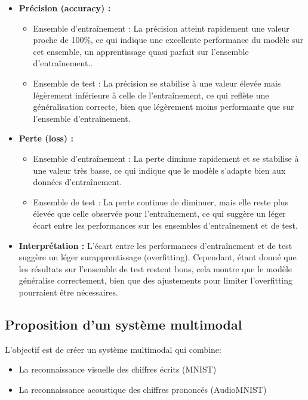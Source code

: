 \begin{itemize}
    \item \textbf{Précision (accuracy) :}
    \begin{itemize}
        \item Ensemble d'entraînement : La précision atteint rapidement une valeur proche de 100\%, ce qui indique une excellente performance du modèle sur cet ensemble, un apprentissage quasi parfait sur l'ensemble d'entraînement..
        \item Ensemble de test : La précision se stabilise à une valeur élevée mais légèrement inférieure à celle de l'entraînement, ce qui reflète une généralisation correcte, bien que légèrement moins performante que sur l'ensemble d'entraînement.
    \end{itemize}
    
    \item \textbf{Perte (loss) :}
    \begin{itemize}
        \item Ensemble d'entraînement : La perte diminue rapidement et se stabilise à une valeur très basse, ce qui indique que le modèle s'adapte bien aux données d'entraînement.
        \item Ensemble de test : La perte continue de diminuer, mais elle reste plus élevée que celle observée pour l'entraînement, ce qui suggère un léger écart entre les performances sur les ensembles d'entraînement et de test. 
    \end{itemize}
    
    \item \textbf{Interprétation :} L'écart entre les performances d'entraînement et de test suggère un léger surapprentissage (overfitting). Cependant, étant donné que les résultats sur l'ensemble de test restent bons, cela montre que le modèle généralise correctement, bien que des ajustements pour limiter l'overfitting pourraient être nécessaires.
\end{itemize}


\subsection{Proposition d'un système multimodal}
\label{sec:multimodal}

L'objectif est de créer un système multimodal qui combine:
\begin{itemize}
    \item La reconnaissance visuelle des chiffres écrits (MNIST)
    \item La reconnaissance acoustique des chiffres prononcés (AudioMNIST)
\end{itemize}

